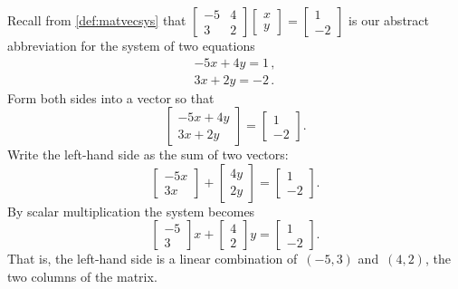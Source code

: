 \begin{example} \label{eg:}
Recall from \autoref{def:matvecsys} that \(\begin{bmatrix} -5&4\\3&2 \end{bmatrix}\begin{bmatrix} x\\y \end{bmatrix}=\begin{bmatrix} 1\\-2 \end{bmatrix}\) is our abstract abbreviation for the system of two equations
\begin{equation*}
\begin{matrix} -5x+4y=1\,,\\ 3x+2y=-2\,. \end{matrix}
\end{equation*}
Form both sides into a vector so that
\begin{equation*}
\begin{bmatrix} -5x+4y\\3x+2y \end{bmatrix}
=\begin{bmatrix} 1\\-2 \end{bmatrix}.
\end{equation*}
Write the left-hand side as the sum of two vectors:
\begin{equation*}
\begin{bmatrix} -5x\\3x \end{bmatrix}
+\begin{bmatrix} 4y\\2y \end{bmatrix}
=\begin{bmatrix} 1\\-2 \end{bmatrix}.
\end{equation*}
By scalar multiplication the system becomes
\begin{equation*}
\begin{bmatrix} -5\\3 \end{bmatrix}x
+\begin{bmatrix} 4\\2 \end{bmatrix}y
=\begin{bmatrix} 1\\-2 \end{bmatrix}.
\end{equation*}
That is, the left-hand side is a linear combination of~\((-5,3)\) and~\((4,2)\), the two columns of the matrix.
\end{example}


